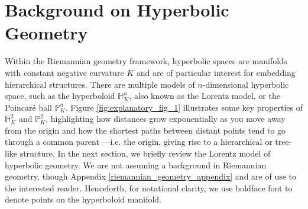 \section{Background on Hyperbolic Geometry}\label{sec:background}

Within the Riemannian geometry framework, hyperbolic spaces are manifolds with constant negative curvature $K$ and are of particular interest for embedding hierarchical structures. There are multiple models of $n$-dimensional hyperbolic space, such as the hyperboloid $\mathbb{H}_K^n$, also known as the Lorentz model, or the Poincar\'e ball $\mathbb{P}_K^n$. %
Figure \ref{fig:explanatory_fig_1} illustrates some key properties of $\mathbb{H}_K^2$ and $\mathbb{P}_K^2$, highlighting how distances grow exponentially as you move away from the origin and how the shortest paths between distant points tend to go through a common parent ---i.e. the origin, giving rise to a hierarchical or tree-like structure. %
In the next section, we briefly review the Lorentz model of hyperbolic geometry. We are not assuming a background in Riemannian geometry, though Appendix \ref{riemannian_geometry_appendix} and \citet{Ratcliffe94} are of use to the interested reader. Henceforth, for notational clarity, we use boldface font to denote points on the hyperboloid manifold.



